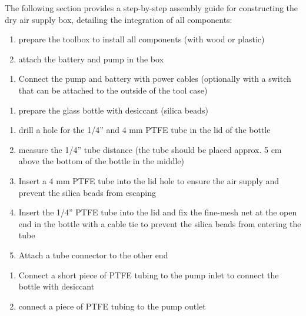 \documentclass[
  11pt,
  letterpaper,
]{book}
\providecommand{\tightlist}{%
  \setlength{\itemsep}{0pt}\setlength{\parskip}{0pt}}
\begin{document}
The following section provides a step-by-step assembly guide for
constructing the dry air supply box, detailing the integration of all
components:

\begin{enumerate}
\def\labelenumi{\arabic{enumi}.}
\setcounter{enumi}{8}
\item
  prepare the toolbox to install all components (with wood or plastic)
\item
  attach the battery and pump in the box\\
\end{enumerate}

\begin{enumerate}
\def\labelenumi{\alph{enumi}.}
\tightlist
\item
  Connect the pump and battery with power cables (optionally with a
  switch that can be attached to the outside of the tool case)
\end{enumerate}

\begin{enumerate}
\def\labelenumi{\arabic{enumi}.}
\setcounter{enumi}{10}
\tightlist
\item
  prepare the glass bottle with desiccant (silica beads)\\
\end{enumerate}

\begin{enumerate}
\def\labelenumi{\alph{enumi}.}
\tightlist
\item
  drill a hole for the 1/4'' and 4 mm PTFE tube in the lid of the
  bottle\\
\item
  measure the 1/4'' tube distance (the tube should be placed approx. 5
  cm above the bottom of the bottle in the middle)\\
\item
  Insert a 4 mm PTFE tube into the lid hole to ensure the air supply and
  prevent the silica beads from escaping\\
\item
  Insert the 1/4'' PTFE tube into the lid and fix the fine-mesh net at
  the open end in the bottle with a cable tie to prevent the silica
  beads from entering the tube\\
\item
  Attach a tube connector to the other end
\end{enumerate}

\begin{enumerate}
\def\labelenumi{\arabic{enumi}.}
\setcounter{enumi}{11}
\item
  Connect a short piece of PTFE tubing to the pump inlet to connect the
  bottle with desiccant
\item
  connect a piece of PTFE tubing to the pump outlet\\
\end{enumerate}
\end{document}
